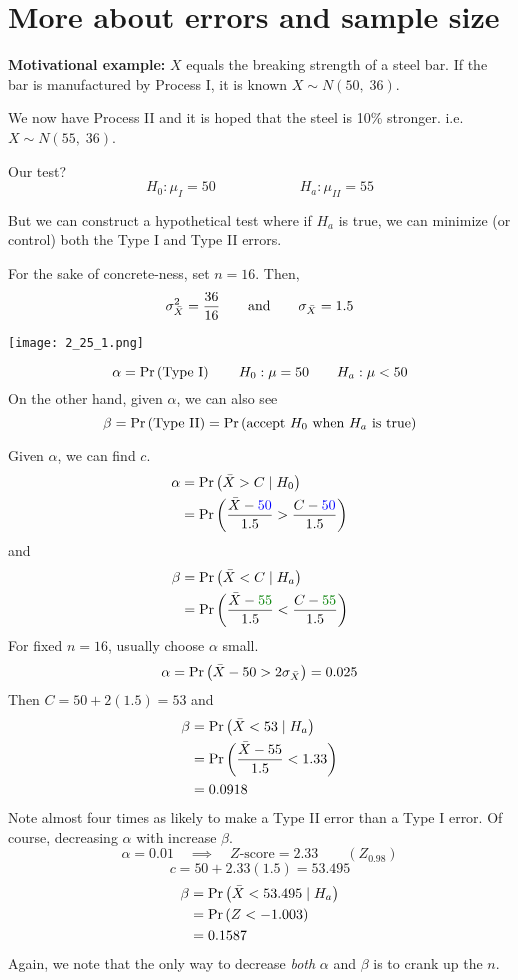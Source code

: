 \section{More about errors and sample size}

\nl \textbf{\color{eblue}Motivational example: } $X$ equals the breaking strength of a steel bar. If the bar is manufactured by Process I, it is known $X \sim N(50,\;36).$

\nl We now have Process II and it is hoped that the steel is 10\% stronger. i.e. $X \sim N(55,\;36)$.

\nl Our test? $$H_0 : \mu_I = 50 \hspace{1in} H_a : \mu_{II} = 55$$
{}

\nl But we can construct a hypothetical test where if $H_a$ is true, we can minimize (or control) both the Type I and Type II errors.

\nl For the sake of concrete-ness, set $n=16$. Then,
$$\sigma_{\bar{X}}^2 = \frac{36}{16} \qquad \text{and} \qquad \sigma_{\bar{X}} = 1.5$$
\begin{center}\texttt{[image: 2\_25\_1.png]}\end{center}
$$\alpha = \P{\text{Type I}} \qquad H_0 : \mu = 50 \qquad H_a : \mu < 50$$
On the other hand, given $\alpha$, we can also see
$$\beta = \P{\text{Type II}} = \P{\text{accept } H_0 \text{ when } H_a \text{ is true}}$$


\nl Given $\alpha$, we can find $c$.
\begin{align*}
    \alpha &= \P{\Xbar > C \mid H_0}\\
    &= \P{\frac{\Xbar -{\color{blue}50}}{1.5} > \frac{C-{\color{blue}50}}{1.5}}
\end{align*}
and
\begin{align*}
    \beta &= \P{\Xbar < C \mid H_a}\\
    &= \P{\frac{\Xbar - {\color{ggreen}55}}{1.5} < \frac{C-{\color{ggreen}55}}{1.5}} 
\end{align*}
For fixed $n=16$, usually choose $\alpha$ small.
$$\alpha = \P{\Xbar -50 > 2\sigma_{\Xbar}} = 0.025$$%
Then $C = 50 + 2(1.5) = 53$ and
\begin{align*}
    \beta &= \P{\Xbar < 53 \mid H_a}\\
    &= \P{\frac{\Xbar - 55}{1.5} < 1.33}\\
    &= 0.0918
\end{align*}
Note almost four times as likely to make a Type II error than a Type I error. Of course, decreasing $\alpha$ with increase $\beta$.
$$\alpha = 0.01 \quad \implies \quad Z\text{-score} = 2.33 \qquad (Z_{0.98})$$
$$c = 50 + 2.33 (1.5) = 53.495$$
\begin{align*}
    \beta &= \P{\Xbar < 53.495 \mid H_a}\\
    &= \P{Z < -1.003}\\
    &= 0.1587
\end{align*}
Again, we note that the only way to decrease \textit{both} $\alpha$ and $\beta$ is to crank up the $n$.

